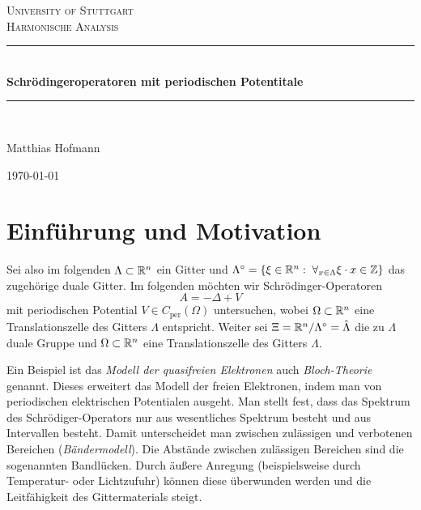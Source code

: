 \documentclass{mywork}
\begin{document}
\begin{titlepage}

\begin{center}



\textsc{\LARGE University of Stuttgart}\\[1.5cm]

\textsc{\Large Harmonische Analysis}\\[0.5cm]


\newcommand{\HRule}{\rule{\linewidth}{0.5mm}}
\HRule \\[0.4cm]
{ \huge \bfseries Schrödingeroperatoren mit periodischen Potentitale}\\[0.4cm]

\HRule \\[1.5cm]


\begin{center} \Large
Matthias Hofmann
\end{center}

\hfill

\vfill

{\large \today}

\end{center}

\end{titlepage}
\section{Einführung und Motivation}
Sei also im folgenden $\Lambda \subset \mathbb{R}^n$ ein Gitter und $\Lambda^\circ= \{\xi \in \R^n: \forall_{x\in \Lambda} \xi \cdot x \in \Z\}$ das zugehörige duale Gitter. Im folgenden möchten wir Schrödinger-Operatoren 
$$ A=- \Delta + V$$
mit periodischen Potential $V\in C_{\text{per}}(\Omega)$ untersuchen, wobei $\Omega \subset \mathbb{R}^n$ eine Translationszelle des Gitters $\Lambda$ entspricht.   Weiter sei $\Xi= \mathbb{R}^n/ \Lambda^\circ= \hat \Lambda$ die zu $\Lambda$ duale Gruppe und $\Omega\subset \mathbb{R}^n$ eine Translationszelle des Gitters $\Lambda$.

Ein Beispiel ist das \emph{Modell der quasifreien Elektronen} auch \emph{Bloch-Theorie} genannt.  Dieses erweitert das Modell  der freien Elektronen, indem man von periodischen elektrischen Potentialen ausgeht. Man stellt fest, dass das Spektrum des Schrödiger-Operators nur aus wesentliches Spektrum besteht und aus Intervallen besteht.  Damit unterscheidet man zwischen zulässigen und verbotenen Bereichen (\emph{Bändermodell}).  Die Abstände zwischen zulässigen Bereichen sind die sogenannten Bandlücken.   Durch äußere Anregung (beispielsweise durch Temperatur- oder Lichtzufuhr) können diese überwunden werden und die Leitfähigkeit des Gittermaterials steigt.
\end{document}

